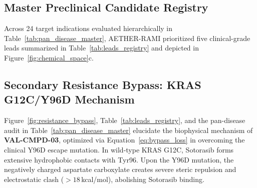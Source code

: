 \documentclass[10pt,journal,compsoc]{IEEEtran}
\begin{document}
\subsection{Master Preclinical Candidate Registry}
Across 24 target indications evaluated hierarchically in Table~\ref{tab:pan_disease_master}, AETHER-RAMI prioritized five clinical-grade leads summarized in Table~\ref{tab:leads_registry} and depicted in Figure~\ref{fig:chemical_space}c.

\begin{table}[t]
\caption{Master Preclinical Candidate Leads Registry Across High-Priority Indications}
\label{tab:leads_registry}
\centering
\small
{}
\end{table}

\subsection{Secondary Resistance Bypass: KRAS G12C/Y96D Mechanism}
Figure~\ref{fig:resistance_bypass}, Table~\ref{tab:leads_registry}, and the pan-disease audit in Table~\ref{tab:pan_disease_master} elucidate the biophysical mechanism of \textbf{VAL-CMPD-03}, optimized via Equation~\eqref{eq:bypass_loss} in overcoming the clinical Y96D escape mutation. In wild-type KRAS G12C, Sotorasib forms extensive hydrophobic contacts with Tyr96. Upon the Y96D mutation, the negatively charged aspartate carboxylate creates severe steric repulsion and electrostatic clash ($>18$\,kcal/mol), abolishing Sotorasib binding.
\end{document}
